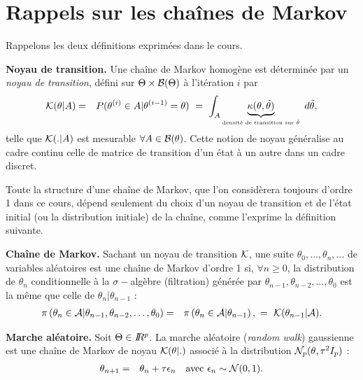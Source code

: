 \section{Rappels sur les chaînes de Markov}\label{markovtheory}

Rappelons les deux définitions exprimées dans le cours. \\

\begin{definition}{\bf Noyau de transition.}
Une chaîne de Markov homogène est déterminée par un \emph{noyau de transition}, défini sur $\Theta\times {\cal{B}}(\Theta)$ à l'itération $i$ par 
\begin{eqnarray*}
{\cal{K}}(\theta|A) & = & P(\theta^{(i)}\in A | \theta^{(i-1)}=\theta) \ = \ \int_{A} \underbrace{{\kappa}(\theta,\tilde{\theta})}_{\text{\tiny densité de transition sur $\tilde{\theta}$}} \ d\tilde{\theta},
\end{eqnarray*} 
telle que ${\cal{K}}(.|A)$ est mesurable $\forall A \in {\cal{B}}(\theta)$. Cette notion de noyau généralise au cadre continu celle de matrice de transition d'un état à un autre dans un cadre discret. 
\end{definition}

\noindent Toute la structure d'une chaîne de Markov, que l'on considèrera toujours d'ordre 1 dans ce cours, dépend seulement du choix d'un noyau de transition et de l'état initial (ou la distribution initiale) de la chaîne, comme l'exprime la définition suivante. 

\begin{definition}{\bf Chaîne de Markov.}
 Sachant un noyau de transition ${\cal{K}}$, une suite $\theta_0,\ldots,\theta_n,\ldots$ de variables aléatoires est une chaîne de Markov d'ordre 1 si, $\forall n\geq 0$, la distribution de $\theta_n$ conditionnelle à la $\sigma-$algèbre (filtration) générée par $\theta_{n-1},\theta_{n-2},\ldots,\theta_0$ est la même que celle de $\theta_{n}|\theta_{n-1}$ :
 \begin{eqnarray*}
 \pi\left(\theta_n\in {\cal{A}} | \theta_{n-1},\theta_{n-2},\ldots,\theta_0\right) & = & \pi\left(\theta_n\in {\cal{A}} | \theta_{n-1}\right), \ 
 = \  {\cal{K}}(\theta_{n-1}|{\cal{A}}).
 \end{eqnarray*}
\end{definition}

\begin{exo}{\bf Marche aléatoire.}
Soit $\Theta\in I\!\!R^p$. La marche aléatoire (\emph{random walk}) gaussienne est une chaîne de Markov de noyau ${\cal{K}}(\theta|.)$ associé à la distribution ${\cal{N}}_p(\theta,\tau^2 I_p)$ :
\begin{eqnarray*}
\theta_{n+1} & = & \theta_n + \tau\epsilon_n \ \ \ \text{avec $\epsilon_n\sim {\cal{N}}(0,1)$.}
\end{eqnarray*}
\end{exo}

